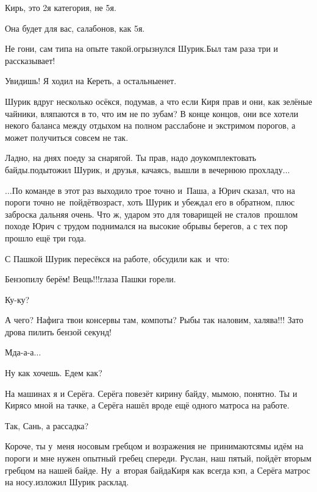 \diagdash Кирь, это 2\sdash я категория, не 5\sdash я.

\diagdash Она будет для вас, салабонов, как 5\sdash я.

\diagdash Не гони, сам типа на опыте такой.\mdash огрызнулся Шурик.\mdash Был там раза три и рассказывает!

\diagdash Увидишь! Я ходил на Кереть, а остальные\mdash нет.

Шурик вдруг несколько осёкся, подумав, а что если Киря прав и они, как зелёные чайники, вляпаются в то, что им не по зубам? В конце концов, они все хотели некого баланса между отдыхом на полном расслабоне и экстримом порогов, а может получиться совсем не так. 

\diagdash Ладно, на днях поеду за снарягой. Ты прав, надо доукомплектовать байды.\mdash подытожил Шурик, и друзья, качаясь, вышли в вечернюю прохладу$\ldots$

\vspace{0.5cm}
$\ldots$По команде в этот раз выходило трое точно и~Паша, а Юрич сказал, что на пороги точно не~пойдёт\mdash возраст, хоть Шурик и убеждал его в обратном, плюс заброска дальняя очень. Что ж, ударом это для товарищей не стало\mdash в~прошлом походе Юрич с трудом поднимался на высокие обрывы берегов, а с тех пор прошло ещё три года.

С Пашкой Шурик пересёкся на работе, обсудили как~и~что:

\diagdash Бензопилу берём! Вещь!!!\mdash глаза Пашки горели.

\diagdash Ку-ку?

\diagdash А чего? Нафига твои консервы там, компоты? Рыбы так наловим, халява!!! Зато дрова пилить бензой секунд!

\diagdash Мда-а-а$\ldots$

\diagdash Ну как хочешь. Едем как?

\diagdash На машинах я и Серёга. Серёга повезёт кирину байду, мы\mdash мою, понятно. Ты и Киря\mdash со мной на тачке, а Серёга нашёл вроде ещё одного матроса на работе.

\diagdash Так, Сань, а рассадка?

\diagdash Короче, ты у~меня носовым гребцом и возражения не~принимаются\mdash мы идём на пороги и мне нужен опытный гребец спереди. Руслан, наш пятый, пойдёт вторым гребцом на нашей байде. Ну~а~вторая байда\mdash Киря как всегда кэп, а Серёга матрос на носу.\mdash изложил Шурик расклад.

